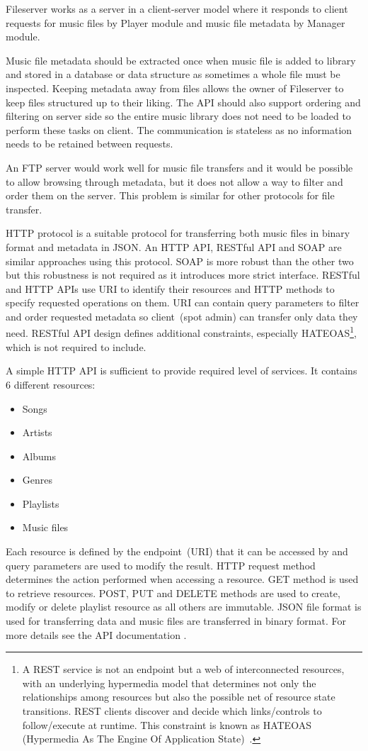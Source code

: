 Fileserver works as a server in a client-server model where it responds to client requests for music files by Player module and music file metadata by Manager module.
\par
Music file metadata should be extracted once when music file is added to library and stored in a database or data structure as sometimes a whole file must be inspected. Keeping metadata away from files allows the owner of Fileserver to keep files structured up to their liking. The API should also support ordering and filtering on server side so the entire music library does not need to be loaded to perform these tasks on client. The communication is stateless as no information needs to be retained between requests.
\par
An FTP server would work well for music file transfers and it would be possible to allow browsing through metadata, but it does not allow a way to filter and order them on the server. This problem is similar for other protocols for file transfer.
\par
HTTP protocol is a suitable protocol for transferring both music files in binary format and metadata in JSON. An HTTP API, RESTful API and SOAP are similar approaches using this protocol. SOAP is more robust than the other two but this robustness is not required as it introduces more strict interface. RESTful and HTTP APIs use URI to identify their resources and HTTP methods to specify requested operations on them. URI can contain query parameters to filter and order requested metadata so client~(spot admin) can transfer only data they need. RESTful API design defines additional constraints, especially HATEOAS\footnote{A REST service is not an endpoint but a web of interconnected resources,
with an underlying hypermedia model that determines not only the relationships among resources but also the possible net of resource state transitions.
REST clients discover and decide which links/controls to follow/execute at runtime. This constraint is known as HATEOAS (Hypermedia As The Engine Of
Application State)~\citep{10.1007/978-3-642-19394-1_12}.}, which is not required to include.
\par
A simple HTTP API is sufficient to provide required level of services. It contains 6 different resources:
\begin{itemize}
    \item Songs
    \item Artists
    \item Albums
    \item Genres
    \item Playlists
    \item Music files
\end{itemize}
Each resource is defined by the endpoint~(URI) that it can be accessed by and query parameters are used to modify the result. HTTP request method determines the action performed when accessing a resource. GET method is used to retrieve resources. POST, PUT and DELETE methods are used to create, modify or delete playlist resource as all others are immutable. JSON file format is used for transferring data and music files are transferred in binary format. For more details see the API documentation .

